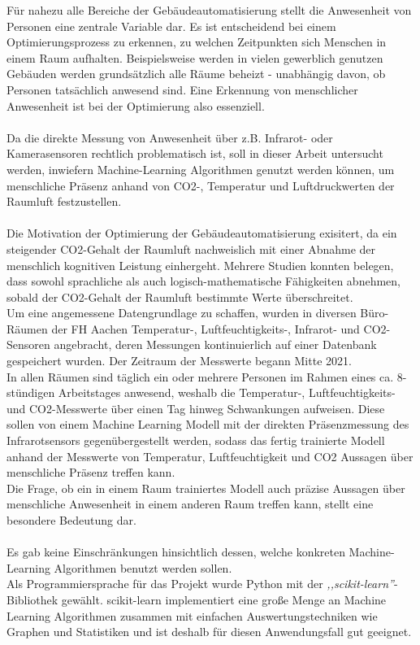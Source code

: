 Für nahezu alle Bereiche der Gebäudeautomatisierung stellt die Anwesenheit 
von Personen eine zentrale Variable dar. Es ist entscheidend bei einem Optimierungsprozess zu erkennen, zu
welchen Zeitpunkten sich Menschen in einem Raum aufhalten. Beispielsweise werden in vielen gewerblich 
genutzen Gebäuden werden grundsätzlich alle Räume beheizt - unabhängig davon, ob Personen tatsächlich anwesend sind. 
Eine Erkennung von menschlicher Anwesenheit ist bei der Optimierung also essenziell.\\\\
Da die direkte Messung von Anwesenheit über z.B. Infrarot- oder Kamerasensoren rechtlich problematisch ist, 
soll in dieser Arbeit untersucht werden, inwiefern Machine-Learning Algorithmen genutzt werden können, 
um menschliche Präsenz anhand von CO2-, Temperatur und Luftdruckwerten der Raumluft festzustellen.\\\\
Die Motivation der Optimierung der Gebäudeautomatisierung exisitert, da ein steigender CO2-Gehalt der 
Raumluft nachweislich mit einer Abnahme der menschlich kognitiven Leistung einhergeht. Mehrere Studien
konnten belegen, dass sowohl sprachliche als auch logisch-mathematische Fähigkeiten abnehmen, sobald 
der CO2-Gehalt der  Raumluft bestimmte Werte überschreitet.\\ 
Um eine angemessene Datengrundlage zu schaffen, wurden in diversen Büro-Räumen der FH Aachen Temperatur-,
Luftfeuchtigkeits-, Infrarot- und CO2-Sensoren angebracht, deren Messungen kontinuierlich auf einer Datenbank
gespeichert wurden. Der Zeitraum der Messwerte begann Mitte 2021.\\
In allen Räumen sind täglich ein oder mehrere
Personen im Rahmen eines ca. 8-stündigen Arbeitstages anwesend, weshalb die Temperatur-, Luftfeuchtigkeits-
und CO2-Messwerte über einen Tag hinweg Schwankungen aufweisen. Diese sollen von einem Machine Learning Modell
mit der direkten Präsenzmessung des Infrarotsensors gegenübergestellt werden, sodass das fertig trainierte Modell
anhand der Messwerte von Temperatur, Luftfeuchtigkeit und CO2 Aussagen über menschliche Präsenz treffen kann.\\
Die Frage, ob ein in einem Raum trainiertes Modell auch präzise Aussagen über menschliche Anwesenheit in einem anderen Raum
treffen kann, stellt eine besondere Bedeutung dar.\\\\
Es gab keine Einschränkungen hinsichtlich dessen, welche konkreten Machine-Learning Algorithmen 
benutzt werden sollen.\\
Als Programmiersprache für das Projekt wurde Python mit der \textit{,,scikit-learn''}-Bibliothek gewählt. scikit-learn
implementiert eine große Menge an Machine Learning Algorithmen zusammen mit einfachen Auswertungstechniken 
wie Graphen und Statistiken und ist deshalb für diesen Anwendungsfall gut geeignet.



